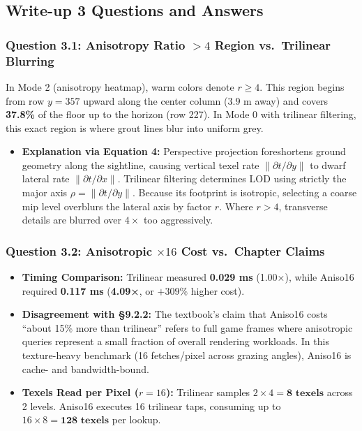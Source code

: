 \documentclass[10pt,a4paper]{article}
\begin{document}
\subsection{Write-up 3 Questions and Answers}

\subsubsection*{Question 3.1: Anisotropy Ratio $> 4$ Region vs.\ Trilinear Blurring}
In Mode 2 (anisotropy heatmap), warm colors denote $r \ge 4$. This region begins from row $y = 357$ upward along the center column ($3.9\text{ m}$ away) and covers \textbf{37.8\%} of the floor up to the horizon (row 227). In Mode 0 with trilinear filtering, this exact region is where grout lines blur into uniform grey.
\begin{itemize}
    \item \textbf{Explanation via Equation 4:} Perspective projection foreshortens ground geometry along the sightline, causing vertical texel rate $\|\partial t / \partial y\|$ to dwarf lateral rate $\|\partial t / \partial x\|$. Trilinear filtering determines LOD using strictly the major axis $\rho = \|\partial t / \partial y\|$. Because its footprint is isotropic, selecting a coarse mip level overblurs the lateral axis by factor $r$. Where $r > 4$, transverse details are blurred over $4\times$ too aggressively.
\end{itemize}

\subsubsection*{Question 3.2: Anisotropic $\times16$ Cost vs.\ Chapter Claims}
\begin{itemize}
    \item \textbf{Timing Comparison:} Trilinear measured \textbf{0.029 ms} (1.00×), while Aniso16 required \textbf{0.117 ms} (\textbf{4.09×}, or $+309\%$ higher cost).
    \item \textbf{Disagreement with §9.2.2:} The textbook's claim that Aniso16 costs ``about 15\% more than trilinear'' refers to full game frames where anisotropic queries represent a small fraction of overall rendering workloads. In this texture-heavy benchmark (16 fetches/pixel across grazing angles), Aniso16 is cache- and bandwidth-bound.
    \item \textbf{Texels Read per Pixel ($r = 16$):} Trilinear samples $2 \times 4 = \mathbf{8\text{ texels}}$ across 2 levels. Aniso16 executes 16 trilinear taps, consuming up to $16 \times 8 = \mathbf{128\text{ texels}}$ per lookup.
\end{itemize}
\end{document}
